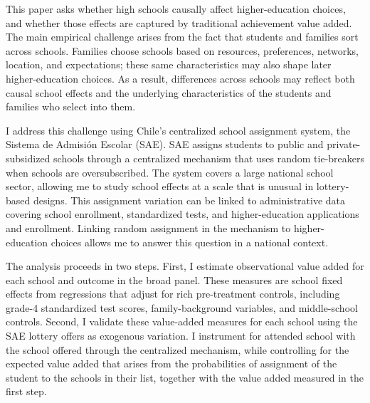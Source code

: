 \documentclass[a4paper, article, english, oneside, unknownkeysallowed, 12pt]{memoir}
\begin{document}
This paper asks whether high schools causally affect higher-education choices, and whether those effects are captured by traditional achievement value added.
The main empirical challenge arises from the fact that students and families sort across schools.
Families choose schools based on resources, preferences, networks, location, and expectations; these same characteristics may also shape later higher-education choices.
As a result, differences across schools may reflect both causal school effects and the underlying characteristics of the students and families who select into them.

I address this challenge using Chile's centralized school assignment system, the Sistema de Admisi\'on Escolar (SAE).
SAE assigns students to public and private-subsidized schools through a centralized mechanism that uses random tie-breakers when schools are oversubscribed.
The system covers a large national school sector, allowing me to study school effects at a scale that is unusual in lottery-based designs.
This assignment variation can be linked to administrative data covering school enrollment, standardized tests, and higher-education applications and enrollment.
Linking random assignment in the mechanism to higher-education choices allows me to answer this question in a national context.


The analysis proceeds in two steps.
First, I estimate observational value added for each school and outcome in the broad panel.
These measures are school fixed effects from regressions that adjust for rich pre-treatment controls, including grade-4 standardized test scores, family-background variables, and middle-school controls.
Second, I validate these value-added measures for each school using the SAE lottery offers as exogenous variation.
I instrument for attended school with the school offered through the centralized mechanism, while controlling for the expected value added that arises from the probabilities of assignment of the student to the schools in their list, together with the value added measured in the first step.
\end{document}
